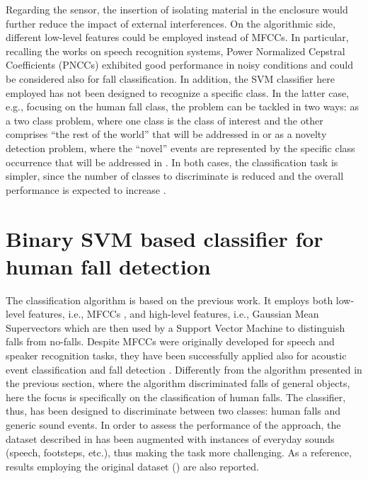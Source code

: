 Regarding the sensor, the insertion of isolating material in the enclosure would further reduce the impact of external interferences. On the algorithmic side, different low-level features could be employed instead of MFCCs. In particular, recalling the works on speech recognition systems, Power Normalized Cepstral Coefficients (PNCCs) \cite{Kim12} exhibited good performance in noisy conditions and could be considered also for fall classification. In addition, the SVM classifier here employed has not been designed to recognize a specific class. In the latter case, e.g., focusing on the human fall class, the problem can be tackled in two ways: as a two class problem, where one class is the class of interest and the other comprises ``the rest of the world'' that will be addressed in  or as a novelty detection problem, where the ``novel'' events are represented by the specific class occurrence that will be addressed in . In both cases, the classification task is simpler, since the number of classes to discriminate is reduced and the overall performance is expected to increase \cite{bishop06}.

\section{Binary SVM based classifier for human fall detection}
\label{sec:biclass_svm}

The classification algorithm is based on the previous work. It employs both low-level features, i.e., MFCCs \cite{Davis80}, and high-level features, i.e., Gaussian Mean Supervectors which are then used by a Support Vector Machine to distinguish falls from no-falls. Despite MFCCs were originally developed for speech and speaker recognition tasks, they have been successfully applied also for acoustic event classification \cite{Temko06} and fall detection \cite{zigel2009method}. Differently from the algorithm presented in the previous section, where the algorithm discriminated falls of general objects, here the focus is specifically on the classification of human falls. The classifier, thus, has been designed to discriminate between two classes: human falls and generic sound events. In order to assess the performance of the approach, the dataset described in  has been augmented with instances of everyday sounds (speech, footsteps, etc.), thus making the task more challenging. As a reference, results employing the original dataset () are also reported.

